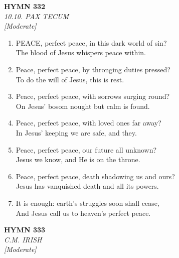 \documentclass[11pt,a4paper]{article}
\begin{document}
\newpage
\begin{center}
    {\Large \textbf{HYMN 332}}
    \\
    \textit{10.10. PAX TECUM}
    \\
    \textit{\small [Moderate]}
\end{center}
\vspace{1em}

\begin{enumerate}
    \item PEACE, perfect peace, in this dark world of sin? \\
        The blood of Jesus whispers peace within.

    \item Peace, perfect peace, by thronging duties pressed? \\
        To do the will of Jesus, this is rest.

    \item Peace, perfect peace, with sorrows surging round? \\
        On Jesus' bosom nought but calm is found.

    \item Peace, perfect peace, with loved ones far away? \\
        In Jesus' keeping we are safe, and they.

    \item Peace, perfect peace, our future all unknown? \\
        Jesus we know, and He is on the throne.

    \item Peace, perfect peace, death shadowing us and ours? \\
        Jesus has vanquished death and all its powers.

    \item It is enough: earth's struggles soon shall cease, \\
        And Jesus call us to heaven's perfect peace.

\end{enumerate}

\newpage
\begin{center}
    {\Large \textbf{HYMN 333}}
    \\
    \textit{C.M. IRISH}
    \\
    \textit{\small [Moderate]}
\end{center}
\vspace{1em}
\end{document}
